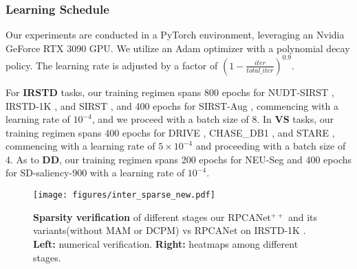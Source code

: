 \documentclass[10pt,journal,compsoc]{IEEEtran}
\begin{document}
\subsubsection{Learning Schedule}
Our experiments are conducted in a PyTorch environment, leveraging an Nvidia GeForce RTX 3090 GPU. We utilize an Adam \cite{kingma-2014-adam} optimizer with a polynomial decay policy. The learning rate is adjusted by a factor of $\left(1 - \frac{iter}{total\_iter}\right)^{0.9}$. 

For \textbf{IRSTD} tasks, our training regimen spans 800 epochs for NUDT-SIRST \cite{li-2023-dnanet}, IRSTD-1K \cite{zhang-2022-isnet}, and SIRST \cite{dai-2021-acm}, and 400 epochs for SIRST-Aug \cite{zhang-2023-agpc}, commencing with a learning rate of $10^{-4}$, and we proceed with a batch size of 8. In \textbf{VS} tasks, our training regimen spans 400 epochs for DRIVE \cite{staal-2004-drive}, CHASE\_DB1 \cite{fraz-2012-chasedb1}, and STARE \cite{hoover-2000-stare}, commencing with a learning rate of $5 \times 10^{-4}$ and proceeding with a batch size of 4. 
As to \textbf{DD}, our training regimen spans 200 epochs for NEU-Seg \cite{dong-2019-neuseg} and 400 epochs for SD-saliency-900 \cite{song-2020-MCITF} with a learning rate of $10^{-4}$. 
\begin{figure}[!t]
\setlength{\abovecaptionskip}{1pt}
\setlength{\belowcaptionskip}{1pt}
\centering
   \texttt{[image: figures/inter\_sparse\_new.pdf]}
   \caption{\textbf{Sparsity verification} of different stages our RPCANet$^{++}$ and its variants(without MAM or DCPM) vs RPCANet \cite{wu-2024-rpcanet} on IRSTD-1K \cite{zhang-2022-isnet}. \textbf{Left:} numerical verification. \textbf{Right:} heatmaps among different stages.}
   \label{fig:inters}
   \vspace{-0.35cm}
\end{figure}
\end{document}
